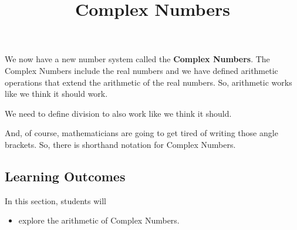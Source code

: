 \documentclass{ximera}
\title{Complex Numbers}
\begin{document}
\begin{abstract}
\end{abstract}
\maketitle







We now have a new number system called the \textbf{Complex Numbers}.  The Complex Numbers include the real numbers and we have defined arithmetic operations that extend the arithmetic of the real numbers.  So, arithmetic works like we think it should work.

We need to define division to also work like we think it should.  


And, of course, mathematicians are going to get tired of writing those angle brackets.  So, there is shorthand notation for Complex Numbers.





\subsection{Learning Outcomes}

\begin{sectionOutcomes}
In this section, students will 

\begin{itemize}
\item explore the arithmetic of Complex Numbers.
\end{itemize}
\end{sectionOutcomes}
\end{document}

